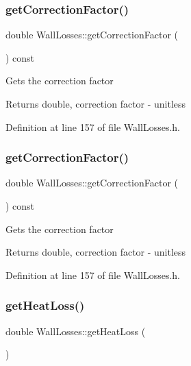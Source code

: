 \subsubsection{\texorpdfstring{get\+Correction\+Factor()}{getCorrectionFactor()}\hspace{0.1cm}{\footnotesize\ttfamily [2/3]}}
{\footnotesize\ttfamily double Wall\+Losses\+::get\+Correction\+Factor (\begin{DoxyParamCaption}{ }\end{DoxyParamCaption}) const\hspace{0.3cm}{\ttfamily [inline]}}

Gets the correction factor \begin{DoxyReturn}{Returns}
double, correction factor -\/ unitless 
\end{DoxyReturn}


Definition at line 157 of file Wall\+Losses.\+h.

\mbox{\label{class_wall_losses_a4ce6a0ec36cd868b14b041f18251cb6d}} 
\subsubsection{\texorpdfstring{get\+Correction\+Factor()}{getCorrectionFactor()}\hspace{0.1cm}{\footnotesize\ttfamily [3/3]}}
{\footnotesize\ttfamily double Wall\+Losses\+::get\+Correction\+Factor (\begin{DoxyParamCaption}{ }\end{DoxyParamCaption}) const\hspace{0.3cm}{\ttfamily [inline]}}

Gets the correction factor \begin{DoxyReturn}{Returns}
double, correction factor -\/ unitless 
\end{DoxyReturn}


Definition at line 157 of file Wall\+Losses.\+h.

\mbox{\label{class_wall_losses_a884da3507498878f619cbe5ba340c0ef}} 
\subsubsection{\texorpdfstring{get\+Heat\+Loss()}{getHeatLoss()}\hspace{0.1cm}{\footnotesize\ttfamily [1/3]}}
{\footnotesize\ttfamily double Wall\+Losses\+::get\+Heat\+Loss (\begin{DoxyParamCaption}{ }\end{DoxyParamCaption})}

